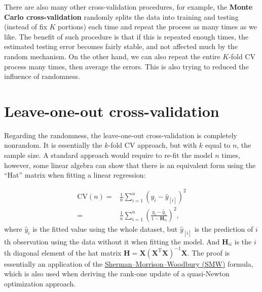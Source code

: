 \documentclass[
]{book}
\theoremstyle{definition}
\theoremstyle{definition}
\theoremstyle{definition}
\theoremstyle{definition}
\theoremstyle{remark}
\begin{document}
There are also many other cross-validation procedures, for example, the \textbf{Monte Carlo cross-validation} randomly splits the data into training and testing (instead of fix \(K\) portions) each time and repeat the process as many times as we like. The benefit of such procedure is that if this is repeated enough times, the estimated testing error becomes fairly stable, and not affected much by the random mechanism. On the other hand, we can also repeat the entire \(K\)-fold CV process many times, then average the errors. This is also trying to reduced the influence of randomness.

\hypertarget{leave-one-out-cross-validation}{%
\section{Leave-one-out cross-validation}\label{leave-one-out-cross-validation}}

Regarding the randomness, the leave-one-out cross-validation is completely nonrandom. It is essentially the \(k\)-fold CV approach, but with \(k\) equal to \(n\), the sample size. A standard approach would require to re-fit the model \(n\) times, however, some linear algebra can show that there is an equivalent form using the ``Hat'' matrix when fitting a linear regression:

\begin{align}
\text{CV}(n) =& \frac{1}{n}\sum_{i=1}^n (y_i - \widehat{y}_{[i]})^2\\
=& \frac{1}{n} \sum_{i=1}^n \left( \frac{y_i - \widehat{y}_i}{1 - \mathbf{H}_{ii}} \right)^2,
\end{align}
where \(\widehat{y}_{i}\) is the fitted value using the whole dataset, but \(\widehat{y}_{[i]}\) is the prediction of \(i\)th observation using the data without it when fitting the model. And \(\mathbf{H}_{ii}\) is the \(i\)th diagonal element of the hat matrix \(\mathbf{H}= \mathbf{X}(\mathbf{X}^\text{T}\mathbf{X})^{-1} \mathbf{X}\). The proof is essentially an application of the \href{https://en.wikipedia.org/wiki/Sherman\%E2\%80\%93Morrison_formula}{Sherman--Morrison--Woodbury (SMW)} formula, which is also used when deriving the rank-one update of a quasi-Newton optimization approach.
\end{document}
